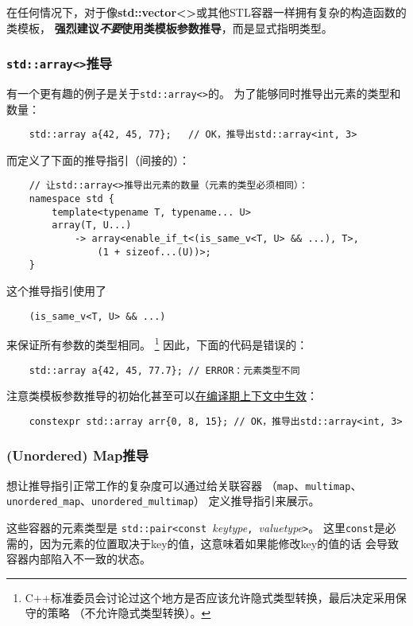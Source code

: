 在任何情况下，对于像\textbf{std::vector<>}或其他STL容器一样拥有复杂的构造函数的类模板，
\textbf{强烈建议\emph{不要}使用类模板参数推导}，而是显式指明类型。

\subsubsection*{\texttt{std::array<>}推导}\label{ch9.2.6.3}
有一个更有趣的例子是关于\texttt{std::array<>}的。
为了能够同时推导出元素的类型和数量：
\begin{lstlisting}
    std::array a{42, 45, 77};   // OK，推导出std::array<int, 3>
\end{lstlisting}
而定义了下面的推导指引（间接的）：
\begin{lstlisting}
    // 让std::array<>推导出元素的数量（元素的类型必须相同）：
    namespace std {
        template<typename T, typename... U>
        array(T, U...)
            -> array<enable_if_t<(is_same_v<T, U> && ...), T>,
                (1 + sizeof...(U))>;
    }
\end{lstlisting}
这个推导指引使用了
\begin{lstlisting}
    (is_same_v<T, U> && ...)
\end{lstlisting}
来保证所有参数的类型相同。
\footnote{C++标准委员会讨论过这个地方是否应该允许隐式类型转换，最后决定采用保守的策略
（不允许隐式类型转换）。}
因此，下面的代码是错误的：
\begin{lstlisting}
    std::array a{42, 45, 77.7}; // ERROR：元素类型不同
\end{lstlisting}
注意类模板参数推导的初始化甚至可以\hyperref[ch28.5]{在编译期上下文中生效}：
\begin{lstlisting}
    constexpr std::array arr{0, 8, 15}; // OK，推导出std::array<int, 3>
\end{lstlisting}

\subsubsection*{(Unordered) Map推导}
想让推导指引正常工作的复杂度可以通过给关联容器
（\texttt{map}、\texttt{multimap}、\texttt{unordered\_map}、\texttt{unordered\_multimap}）
定义推导指引来展示。

这些容器的元素类型是
\texttt{std::pair<const }\emph{keytype}\texttt{, }\emph{valuetype}\texttt{>}。
这里\texttt{const}是必需的，因为元素的位置取决于key的值，这意味着如果能修改key的值的话
会导致容器内部陷入不一致的状态。

